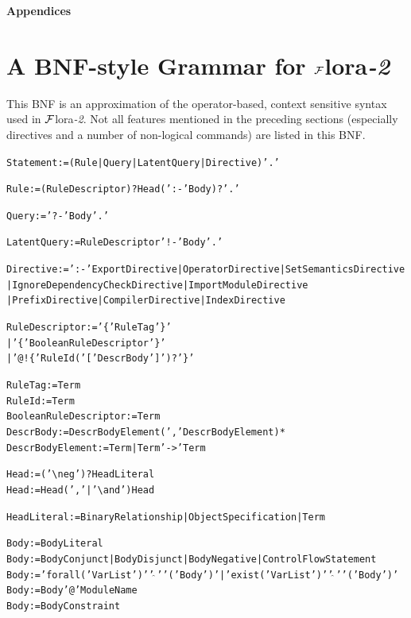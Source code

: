 \documentclass[11pt]{article}
\newcommand{\FLORA}{{\mbox{\sc ${\cal F}${lora}\rm\emph{-2}}}\xspace}
\newcommand{\ERGO}{\ensuremath{\cal{E}\mbox{\smaller{\sc{RGO}}}}\xspace}
\newcommand{\FLSYSTEM}{\FLORA}
\newcommand{\bs}{\textbackslash}
\newcommand{\RULELOGNEG}{{\texttt{{\bs}neg}}\xspace}
\begin{document}
\appendix

\newpage

\noindent
{\LARGE\bf Appendices}

\section{A BNF-style Grammar for \FLSYSTEM}\label{app-bnf}

This BNF is an approximation of the operator-based,
context sensitive syntax used in \FLSYSTEM. Not all features mentioned in
the preceding sections (especially directives and a number of
non-logical commands) are listed in this BNF.

\begin{alltt}

Statement := (Rule | Query | LatentQuery | Directive) '.'

Rule := (RuleDescriptor)? Head (':-' Body)? '.'

Query := '?-' Body '.'

LatentQuery := RuleDescriptor '!-' Body '.'

Directive := ':-' ExportDirective | OperatorDirective | SetSemanticsDirective
	             | IgnoreDependencyCheckDirective | ImportModuleDirective
                     | PrefixDirective | CompilerDirective | IndexDirective

RuleDescriptor := '\@\{' RuleTag '\}'
                  | '\@\@\{' BooleanRuleDescriptor '\}'
                  | '@!\{' RuleId ( '[' DescrBody ']' )? '\}'

RuleTag := Term
RuleId := Term
BooleanRuleDescriptor := Term
DescrBody := DescrBodyElement (',' DescrBodyElement)*
DescrBodyElement := Term | Term '->' Term

Head := ('\RULELOGNEG')? HeadLiteral
Head := Head (',' | '\bs{}and') Head

HeadLiteral := BinaryRelationship | ObjectSpecification | Term

Body := BodyLiteral
Body := BodyConjunct | BodyDisjunct | BodyNegative | ControlFlowStatement
Body := 'forall(' VarList ')' '\ensuremath{\widehat{\ }}' '(' Body ')' | 'exist(' VarList ')' '\ensuremath{\widehat{\ }}' '(' Body ')'
Body := Body '@' ModuleName
Body := BodyConstraint


\end{alltt}
\end{document}
